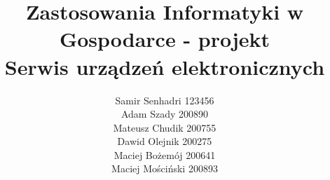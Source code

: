 \documentclass[a4paper,11pt]{article}
\begin{document}
\makeatletter
\newcommand{\linia}{\noindent\rule{\linewidth}{0.4mm}}
\renewcommand{\maketitle}{
\begin{titlepage}
    \begin{center} \LARGE 
    \textbf{\textsc{
	    Politechnika Wrocławska \\
	    Wydział Elektroniki}}
    \end{center}
	\linia

	\vspace{3cm}
	\begin{center}
		\LARGE \textsc{\@title}
	\end{center}
	
	\vspace{1cm}
	\noindent
	\begin{minipage}[t]{0.5\textwidth}
		\begin{flushleft}
			\textit{\small Autorzy:}\\
			\normalsize \textsc{\@author} \par
		\end{flushleft}
	\end{minipage}
	\begin{minipage}[t]{0.5\textwidth}
		\begin{flushright}
			\textit{\small Praca wykonana pod przewodnictwem:}\\
			\normalsize \textsc{dr inż. Marek Woda} \par
		\end{flushright}
	\end{minipage}

    \vfill
    \begin{center}
    Wrocław, \@date
    \end{center}
\end{titlepage}%
}



\author{Samir Senhadri 123456\\ Adam Szady 200890 \\ Mateusz Chudik 200755 \\ Dawid Olejnik 200275 \\ Maciej Bożemój 200641 \\ Maciej Mościński 200893 }
\title{Zastosowania Informatyki w Gospodarce - projekt\\ \vspace{1.5cm} Serwis urządzeń elektronicznych\\}
\end{document}
